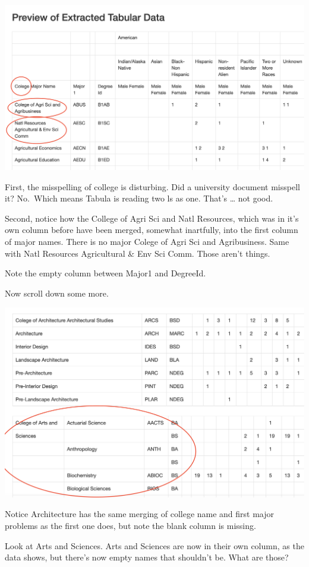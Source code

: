 \documentclass[]{book}
\begin{document}
\includegraphics[width=33.44in]{images/pdfs3}

First, the misspelling of college is disturbing. Did a university document misspell it? No.~Which means Tabula is reading two ls as one. That's \ldots{} not good.

Second, notice how the College of Agri Sci and Natl Resources, which was in it's own column before have been merged, somewhat inartfully, into the first column of major names. There is no major Colege of Agri Sci and Agribusiness. Same with Natl Resources Agricultural \& Env Sci Comm. Those aren't things.

Note the empty column between Major1 and DegreeId.

Now scroll down some more.

\includegraphics[width=30.36in]{images/pdfs4}

Notice Architecture has the same merging of college name and first major problems as the first one does, but note the blank column is missing.

Look at Arts and Sciences. Arts and Sciences are now in their own column, as the data shows, but there's now empty names that shouldn't be. What are those?
\end{document}
